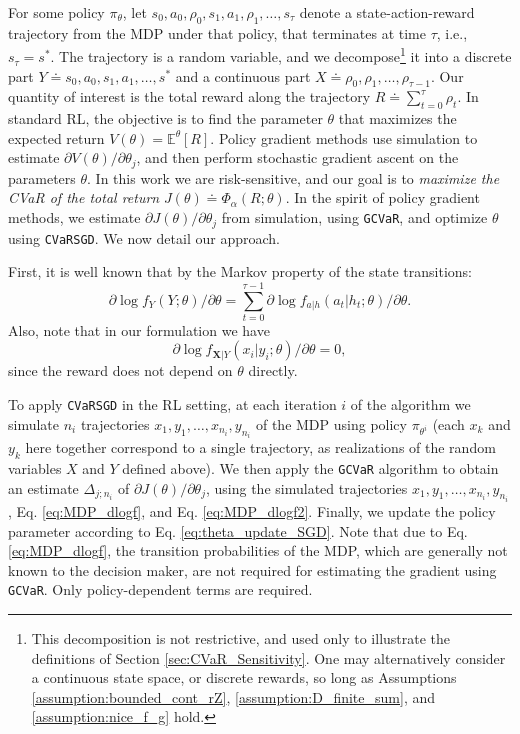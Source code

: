\documentclass[letterpaper]{article}
\newcommand{\E}{\mathbb{E}}
\newcommand{\cvar}{\Phi_\alpha}
\newcommand{\bX}{\mathbf{X}}
\begin{document}
For some policy $\pi_\theta$, let $s_0,a_0,\rho_0,s_1,a_1,\rho_1,\dots,s_\tau$ denote a state-action-reward trajectory from the MDP under that policy, that terminates at time $\tau$, i.e., $s_\tau = s^*$. The trajectory is a random variable, and we decompose\footnote{This decomposition is not restrictive, and used only to illustrate the definitions of Section \ref{sec:CVaR_Sensitivity}. One may alternatively consider a continuous state space, or discrete rewards, so long as Assumptions \ref{assumption:bounded_cont_rZ}, \ref{assumption:D_finite_sum}, and \ref{assumption:nice_f_g} hold.} it into a discrete part $Y \doteq s_0,a_0,s_1,a_1,\dots,s^*$ and a continuous part $X \doteq \rho_0,\rho_1,\dots,\rho_{\tau-1}$. Our quantity of interest is the total reward along the trajectory $R \doteq \sum_{t=0}^{\tau} \rho_t$.
In standard RL, the objective is to find the parameter $\theta$ that maximizes the expected return $V(\theta) = \E^\theta \left[ R \right]$. Policy gradient methods \cite{baxter2001infinite,MarTsi98,peters_reinforcement_2008} use simulation to estimate $\partial V(\theta) / \partial \theta_j$, and then perform stochastic gradient ascent on the parameters $\theta$. In this work we are risk-sensitive, and our goal is to \emph{maximize the CVaR of the total return}
$
J(\theta) \doteq \cvar (R;\theta).
$
In the spirit of policy gradient methods, we estimate $\partial J(\theta) / \partial \theta_j$ from simulation, using \texttt{GCVaR}, and optimize $\theta$ using \texttt{CVaRSGD}. We now detail our approach.


First, it is well known \cite{MarTsi98} that by the Markov property of the state transitions:
\begin{equation}\label{eq:MDP_dlogf}
\partial \log f_{Y}\left(Y;\theta\right) / \partial \theta = \sum_{t=0}^{\tau-1} \partial \log f_{a|h}(a_t|h_t;\theta)/ \partial \theta.
\end{equation}
Also, note that in our formulation we have
\begin{equation}\label{eq:MDP_dlogf2}
    \partial \log f_{\bX|Y}\left(x_{i}|y_i;\theta\right) / \partial \theta=0,
\end{equation}
since the reward does not depend on $\theta$ directly.

To apply \texttt{CVaRSGD} in the RL setting, at each iteration $i$ of the algorithm we simulate $n_i$ trajectories $x_1,y_1,\dots,x_{n_i},y_{n_i}$ of the MDP using policy $\pi_{\theta^i}$ (each $x_k$ and $y_k$ here together correspond to a single trajectory, as realizations of the random variables $X$ and $Y$ defined above). We then apply the \texttt{GCVaR} algorithm to obtain an estimate $\Delta_{j;n_i}$ of $\partial J(\theta) / \partial \theta_j$, using the simulated trajectories $x_1,y_1,\dots,x_{n_i},y_{n_i}$, Eq. \eqref{eq:MDP_dlogf}, and Eq. \eqref{eq:MDP_dlogf2}.
Finally, we update the policy parameter according to Eq. \eqref{eq:theta_update_SGD}.
Note that due to Eq. \eqref{eq:MDP_dlogf}, the transition probabilities of the MDP, which are generally not known to the decision maker, are not required for estimating the gradient using \texttt{GCVaR}. Only policy-dependent terms are required.
\end{document}
